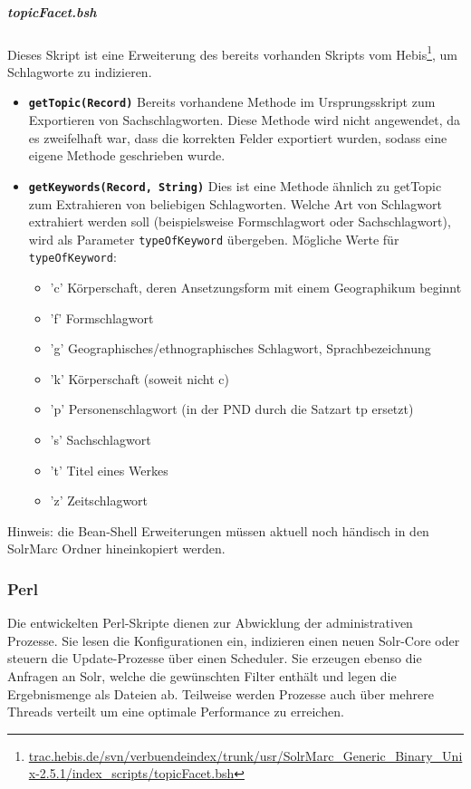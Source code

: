 \documentclass[10pt]{article}
\begin{document}
\subparagraph{topicFacet.bsh}
\label{sec:subpara:topicFacet}
Dieses Skript ist eine Erweiterung des bereits vorhanden Skripts vom Hebis\footnote{\url{trac.hebis.de/svn/verbuendeindex/trunk/usr/SolrMarc_Generic_Binary_Unix-2.5.1/index_scripts/topicFacet.bsh}}, um Schlagworte zu indizieren. 
\begin{itemize}
	\item \textbf{\texttt{getTopic(Record)}} Bereits vorhandene Methode im Ursprungsskript zum Exportieren von Sachschlagworten. Diese Methode wird nicht angewendet, da es zweifelhaft war, dass die korrekten Felder exportiert wurden, sodass eine eigene Methode geschrieben wurde.
	\item \textbf{\texttt{getKeywords(Record, String)}} Dies ist eine Methode ähnlich zu getTopic zum Extrahieren von beliebigen Schlagworten. Welche Art von Schlagwort extrahiert werden soll (beispielsweise Formschlagwort oder Sachschlagwort), wird als Parameter \texttt{typeOfKeyword} übergeben. Mögliche Werte für \texttt{typeOfKeyword}:
	\begin{itemize}
		\item 'c' Körperschaft, deren Ansetzungsform mit einem Geographikum beginnt 
		\item 'f' Formschlagwort 
		\item 'g' Geographisches/ethnographisches Schlagwort, Sprachbezeichnung 
		\item 'k' Körperschaft (soweit nicht c) 
		\item 'p' Personenschlagwort (in der PND durch die Satzart tp ersetzt) 
		\item 's' Sachschlagwort 
		\item 't' Titel eines Werkes 
		\item 'z' Zeitschlagwort 
	\end{itemize}
\end{itemize}
Hinweis: die Bean-Shell Erweiterungen müssen aktuell noch händisch in den SolrMarc Ordner hineinkopiert werden. 

\subsubsection{Perl}
Die entwickelten Perl-Skripte dienen zur Abwicklung der administrativen Prozesse. Sie lesen die Konfigurationen ein, indizieren einen neuen Solr-Core oder steuern die Update-Prozesse über einen Scheduler. Sie erzeugen ebenso die Anfragen an Solr, welche die gewünschten Filter enthält und legen die Ergebnismenge als Dateien ab. Teilweise werden Prozesse auch über mehrere Threads verteilt um eine optimale Performance zu erreichen.
\end{document}
